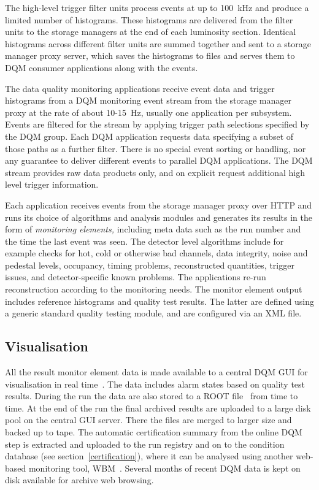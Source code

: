 \documentclass[a4paper]{jpconf}
\begin{document}
The high-level trigger filter units process events at up to 100~kHz and
produce a limited number of histograms.  These histograms are
delivered from the filter units to the storage managers at the end of each
luminosity section.  Identical histograms across different filter units are
summed together and sent to a storage manager proxy server, which saves the
histograms to files and serves them to DQM consumer applications along with
the events.

The data quality monitoring applications receive event data and trigger
histograms from a DQM monitoring event stream from the storage manager proxy
at the rate of about 10-15~Hz, usually one application per subsystem.  Events
are filtered for the stream by applying trigger path selections specified by
the DQM group.  Each DQM application requests data specifying a subset of
those paths as a further filter.  There is no special event sorting or
handling, nor any guarantee to deliver different events to parallel DQM
applications.  The DQM stream provides raw data products only, and on explicit
request additional high level trigger information.

Each application receives events from the storage manager proxy over HTTP and
runs its choice of algorithms and analysis modules and generates its results
in the form of {\em monitoring elements,} including meta data such as the run
number and the time the last event was seen.  The detector level algorithms
include for example checks for hot, cold or otherwise bad channels, data
integrity, noise and pedestal levels, occupancy, timing problems, reconstructed quantities,
trigger issues, and detector-specific known problems.  The applications re-run
reconstruction according to the monitoring needs.  The monitor element output
includes reference histograms and quality test results.  The latter are defined
using a generic standard quality testing module, and are configured via an XML
file.

\subsection{Visualisation}

All the result monitor element data is made available to a central DQM GUI
for visualisation in real time~\cite{dqm_gui_09}.  The data includes alarm
states based on quality test results.  During the run the data are also
stored to a ROOT file~\cite{root} from time to time.  At the end of the run
the final archived results are uploaded to a large disk pool on the central
GUI server.  There the files are merged to larger size and backed up to tape.
The automatic certification summary from the online DQM step is extracted and
uploaded to the run registry and on to the condition database (see
section~\ref{certification}), where it can be analysed using another
web-based monitoring tool, WBM~\cite{wbm}.  Several months of recent DQM data
is kept on disk available for archive web browsing.
\end{document}
